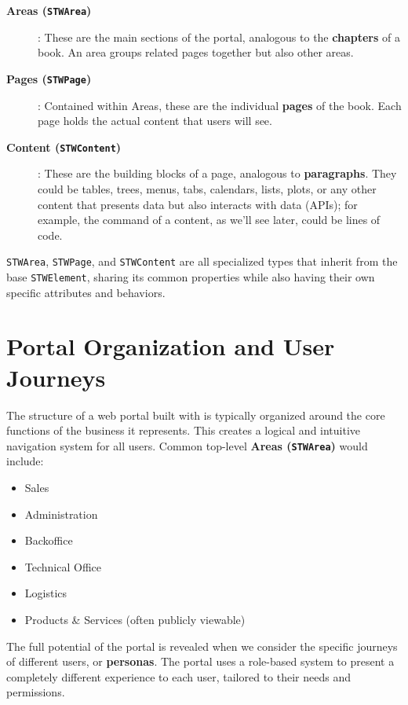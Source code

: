 \begin{description}
\item[\textbf{Areas (\texttt{STWArea})}]: These are the main sections of the portal, analogous to the \textbf{chapters} of a book. An area groups related pages together but also other areas.
\item[\textbf{Pages (\texttt{STWPage})}]: Contained within Areas, these are the individual \textbf{pages} of the book. Each page holds the actual content that users will see.
\item[\textbf{Content (\texttt{STWContent})}]: These are the building blocks of a page, analogous to \textbf{paragraphs}. They could be tables, trees, menus, tabs, calendars, lists, plots, or any other content that presents data but also interacts with data (APIs); for example, the command of a content, as we'll see later, could be lines of code. 
\end{description}

	\texttt{STWArea}, \texttt{STWPage}, and \texttt{STWContent} are all specialized types that inherit from the base \texttt{STWElement}, sharing its common properties while also having their own specific attributes and behaviors.

\section{Portal Organization and User Journeys}
\label{sec:user-journeys}

The structure of a web portal built with \wbdl{} is typically organized around the core functions of the business it represents. This creates a logical and intuitive navigation system for all users. Common top-level \textbf{Areas (\texttt{STWArea})} would include:

\begin{itemize}
	\item Sales
	\item Administration
	\item Backoffice
	\item Technical Office
	\item Logistics
	\item Products \& Services (often publicly viewable)
\end{itemize}

The full potential of the portal is revealed when we consider the specific journeys of different users, or \textbf{personas}. The portal uses a role-based system to present a completely different experience to each user, tailored to their needs and permissions.

